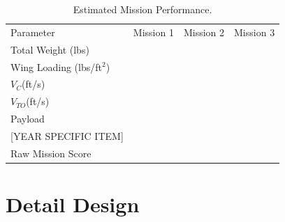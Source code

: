\documentclass[report]{byu-aero}
\begin{document}
\begin{table}[h!]
	\centering
	\caption{Estimated Mission Performance.}
	\label{tab:estimatedmissionperformance}
	\begin{tabular}{ C{1.5in}  C{1in}  C{1in}  C{1in}}
		
		Parameter & Mission 1 & Mission 2 & Mission 3 \\
		
		Total Weight (lbs) & & &\\
		
		Wing Loading (lbs/ft\(^2\)) & & &\\
		
		\(V_C\)(ft/s) & & &\\
		
		\(V_{TO}\)(ft/s) & & &\\
		
		Payload & & &\\
		
		{\color{\BYUred} {\color{BYUred} [YEAR SPECIFIC ITEM]}} & & &\\
		
		Raw Mission Score & & &\\
		
	\end{tabular}
\end{table}


\clearpage
\newpage

\section{Detail Design} %
\label{sec:detaildesign}
\end{document}
